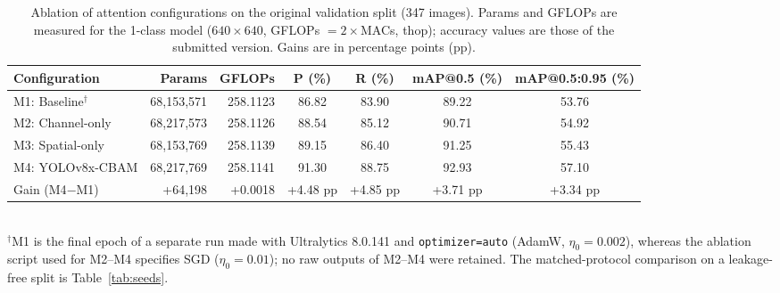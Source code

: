 \begin{table}[!t]
\centering
\caption{Ablation of attention configurations on the original validation split (347 images). Params and GFLOPs are
measured for the 1-class model ($640\times640$, GFLOPs $=2\times$MACs, thop); accuracy values are those of the submitted
version. Gains are in percentage points (pp).}
\label{tab:ablation}
\begin{tabular}{lrrcccc}
\toprule
Configuration & Params & GFLOPs & P (\%) & R (\%) & mAP@0.5 (\%) & mAP@0.5:0.95 (\%) \\
\midrule
M1: Baseline$^{\dagger}$ & 68,153,571 & 258.1123 & 86.82 & 83.90 & 89.22 & 53.76 \\
M2: Channel-only & 68,217,573 & 258.1126 & 88.54 & 85.12 & 90.71 & 54.92 \\
M3: Spatial-only & 68,153,769 & 258.1139 & 89.15 & 86.40 & 91.25 & 55.43 \\
M4: YOLOv8x-CBAM & 68,217,769 & 258.1141 & 91.30 & 88.75 & 92.93 & 57.10 \\
\midrule
Gain (M4$-$M1) & +64,198 & +0.0018 & +4.48 pp & +4.85 pp & +3.71 pp & +3.34 pp \\
\bottomrule
\end{tabular}\\[2pt]
\footnotesize{$^{\dagger}$M1 is the final epoch of a separate run made with Ultralytics 8.0.141 and \texttt{optimizer=auto}
(AdamW, $\eta_0=0.002$), whereas the ablation script used for M2--M4 specifies SGD ($\eta_0=0.01$); no raw outputs of
M2--M4 were retained. The matched-protocol comparison on a leakage-free split is Table~\ref{tab:seeds}.}
\end{table}
